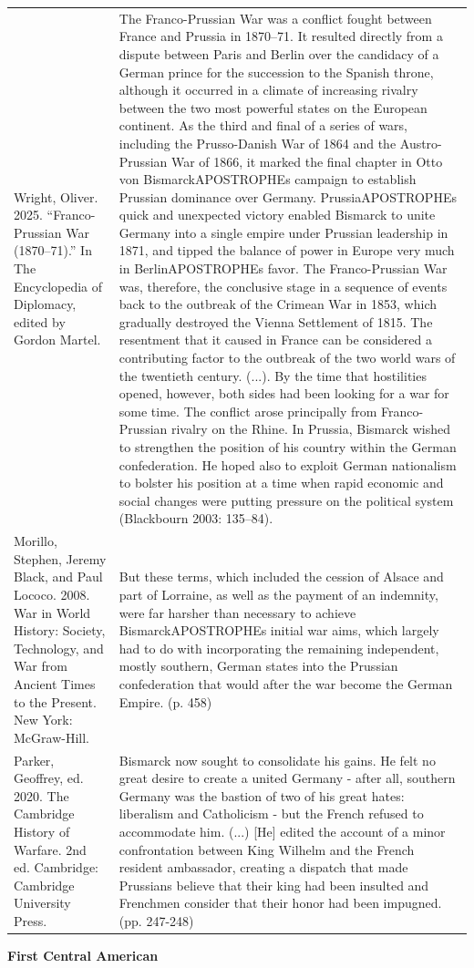 {\begin{longtable}{p{}p{}}
\\
Wright, Oliver. 2025. “Franco-Prussian War (1870–71).” In The Encyclopedia of Diplomacy, edited by Gordon Martel. & The Franco-Prussian War was a conflict fought between France and Prussia in 1870–71. It resulted directly from a dispute between Paris and Berlin over the candidacy of a German prince for the succession to the Spanish throne, although it occurred in a climate of increasing rivalry between the two most powerful states on the European continent. As the third and final of a series of wars, including the Prusso-Danish War of 1864 and the Austro-Prussian War of 1866, it marked the final chapter in Otto von BismarckAPOSTROPHEs campaign to establish Prussian dominance over Germany. PrussiaAPOSTROPHEs quick and unexpected victory enabled Bismarck to unite Germany into a single empire under Prussian leadership in 1871, and tipped the balance of power in Europe very much in BerlinAPOSTROPHEs favor. The Franco-Prussian War was, therefore, the conclusive stage in a sequence of events back to the outbreak of the Crimean War in 1853, which gradually destroyed the Vienna Settlement of 1815. The resentment that it caused in France can be considered a contributing factor to the outbreak of the two world wars of the twentieth century. (...). 
By the time that hostilities opened, however, both sides had been looking for a war for some time. The conflict arose principally from Franco-Prussian rivalry on the Rhine. In Prussia, Bismarck wished to strengthen the position of his country within the German confederation. He hoped also to exploit German nationalism to bolster his position at a time when rapid economic and social changes were putting pressure on the political system (Blackbourn 2003: 135–84).
\\
Morillo, Stephen, Jeremy Black, and Paul Lococo. 2008. War in World History: Society, Technology, and War from Ancient Times to the Present. New York: McGraw-Hill. & But these terms, which included the cession of Alsace and part of Lorraine, as well as the payment of an indemnity, were far harsher than necessary to achieve BismarckAPOSTROPHEs initial war aims, which largely had to do with incorporating the remaining independent, mostly southern, German states into the Prussian confederation that would after the war become the German Empire. (p. 458)
\\
Parker, Geoffrey, ed. 2020. The Cambridge History of Warfare. 2nd ed. Cambridge: Cambridge University Press. & Bismarck now sought to consolidate his gains. He felt no great desire to create a united Germany - after all, southern Germany was the bastion of two of his great hates: liberalism and Catholicism - but the French refused to accommodate him. (...) [He] edited the account of a minor confrontation between King Wilhelm and the French resident ambassador, creating a dispatch that made Prussians believe that their king had been insulted and Frenchmen consider that their honor had been impugned. (pp. 247-248)
\\
\end{longtable}}
\clearpage
         \textbf{First Central American} 


